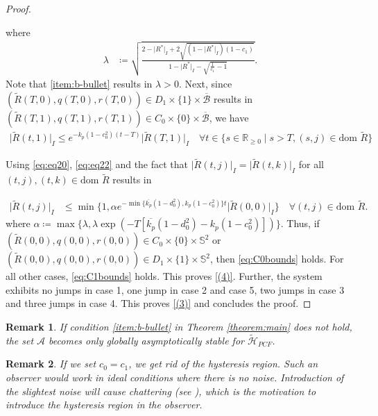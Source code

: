 \documentclass{article}
\newcommand{\dom}{\text{dom }}
\newcommand{\R}[1]{\mathbb{R}^{#1}}
\newtheorem{remark}{Remark}
\newcommand{\Rtilde}{\tilde{R}}
\newcommand{\normSOthree}[1]{{{\vert}#1 {\vert}_I}}
\newcommand{\expo}[1]{e^{#1}}
\newcommand{\Rstar}{{R^*}}
\begin{document}
\begin{proof}
\begin{flushleft}
where 
\begin{align}
    \lambda &\coloneqq \sqrt{{\frac{2 - \normSOthree{\Rstar} + 2\sqrt{(1-\normSOthree{\Rstar})(1-c_1)}}{1 - \normSOthree{\Rstar} - \sqrt{\frac{1}{c_1}-1}}}}. \label{eq:lambda}
\end{align}
Note that \ref{item:b-bullet} results in $\lambda > 0$. Next, since $(\Rtilde(T,0), q(T,0), r(T,0))\in D_1\times \{1\}\times \overline{\mathcal{B}}$ results in $(\Rtilde(T,1), q(T,1), r(T,1))\in C_0\times \{0\}\times \overline{\mathcal{B}}$, we have
\begin{align}\label{eq:eq22}
    \normSOthree{\Rtilde(t,1)} \leq \expo{-k_p(1-c_0^2)(t-T)}\normSOthree{\Rtilde(T,1)} \quad \forall t\in \{s\in\R{}_{\geq 0} \mid s > T, (s,j)\in \dom\Rtilde\}
\end{align}

Using \eqref{eq:eq20}, \eqref{eq:eq22} and the fact that $\normSOthree{\Rtilde(t,j)} = \normSOthree{\Rtilde(t,k)}$ for all $(t,j), (t,k)\in \dom{\Rtilde}$ results in 
\end{flushleft}
\begin{align}
    \normSOthree{\Rtilde(t,j)}&\leq \min\{1, \alpha\expo{-\min\{\overline{k_p}(1-d_0^2), k_p(1-c_0^2)\} t}\normSOthree{\Rtilde(0,0)}\} \quad \forall (t,j) \in \dom\Rtilde. \label{eq:C1bounds}
    \end{align}
where $\alpha \coloneqq \max\{\lambda, \lambda \exp{(-T[\overline{k_p}(1-d_0^2) - k_p(1-c_0^2)])}\}$. Thus, if ${(\Rtilde(0,0), q(0,0), r(0,0))}\in C_0\times\{0\}\times \mathbb{S}^2$ or ${(\Rtilde(0,0), q(0,0), r(0,0))}\in D_1\times\{1\}\times\mathbb{S}^2$, then \eqref{eq:C0bounds} holds. For all other cases, \eqref{eq:C1bounds} holds. This proves \eqref{(4)}.  Further, the system exhibits no jumps in case 1,  one jump in case 2 and case 5, two jumps in case 3 and three jumps in case 4. This proves \eqref{(3)} and concludes the proof.  
\end{proof}

\begin{remark}
    If condition \ref{item:b-bullet} in Theorem \ref{theorem:main} does not hold, the set $\mathcal{A}$ becomes only globally asymptotically stable for $\tilde{\mathcal{H}}_{PCF}$. 
\end{remark}
\begin{remark}\label{remark:hysteresis}
    If we set $c_0 = c_1$, we get rid of the hysteresis region. Such an observer would work in ideal conditions where there is no noise. Introduction of the slightest noise will cause chattering (see \cite{quaternion-ricardo}), which is the motivation to introduce the hysteresis region in the observer. 
\end{remark}
\end{document}
